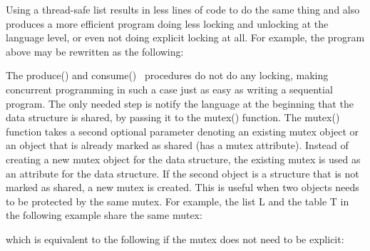 Using a thread-safe list results in less lines of code to do the same
thing and also produces a more efficient program doing less locking and
unlocking at the language level, or even not doing explicit locking at
all. For example, the program above may be rewritten as the following: 


The \textsf{produce()} and \textsf{consume()}
\ procedures do not do any locking, making concurrent programming in
such a case just as easy as writing a sequential program. The only
needed step is notify the language at the beginning that the data
structure is shared, by passing it to the \textsf{mutex()}
function. The \textsf{mutex()} function takes a second
optional parameter denoting an existing mutex object or an object that
is already marked as shared (has a mutex attribute). Instead of
creating a new mutex object for the data structure, the existing mutex
is used as an attribute for the data structure. If the second object is
a structure that is not marked as shared, a new mutex is created. This
is useful when two objects needs to be protected by the same mutex. For
example, the list \textsf{L} and the table
\textsf{T} in the following example share the same mutex:


which is equivalent to the following if the mutex does not need to be
explicit:


